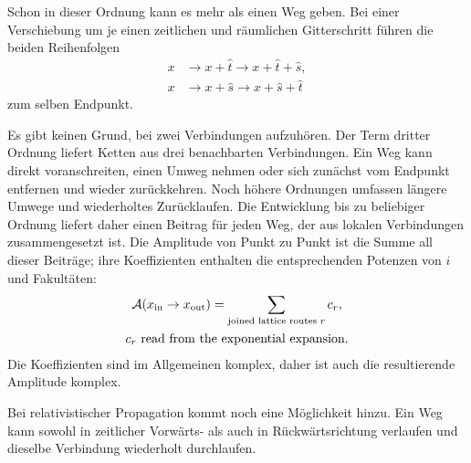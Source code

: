 Schon in dieser Ordnung kann es mehr als einen Weg geben. Bei einer Verschiebung um je einen zeitlichen und räumlichen Gitterschritt führen die beiden Reihenfolgen
\begin{align}
x
&\longrightarrow x+\hat t
\longrightarrow x+\hat t+\hat s,\\
x
&\longrightarrow x+\hat s
\longrightarrow x+\hat s+\hat t
\end{align}
zum selben Endpunkt.

\begin{classroomqa}
\end{classroomqa}

Es gibt keinen Grund, bei zwei Verbindungen aufzuhören. Der Term dritter Ordnung liefert Ketten aus drei benachbarten Verbindungen. Ein Weg kann direkt voranschreiten, einen Umweg nehmen oder sich zunächst vom Endpunkt entfernen und wieder zurückkehren. Noch höhere Ordnungen umfassen längere Umwege und wiederholtes Zurücklaufen. Die Entwicklung bis zu beliebiger Ordnung liefert daher einen Beitrag für jeden Weg, der aus lokalen Verbindungen zusammengesetzt ist. Die Amplitude von Punkt zu Punkt ist die Summe all dieser Beiträge; ihre Koeffizienten enthalten die entsprechenden Potenzen von \(i\) und Fakultäten:
\begin{equation}
\begin{gathered}
\mathcal{A}(x_{\mathrm{in}}\to x_{\mathrm{out}})
=
\sum_{\text{joined lattice routes }r}c_r,
\\
c_r\ \hbox{read from the exponential expansion}.
\end{gathered}
\end{equation}
Die Koeffizienten sind im Allgemeinen komplex, daher ist auch die resultierende Amplitude komplex.

Bei relativistischer Propagation kommt noch eine Möglichkeit hinzu. Ein Weg kann sowohl in zeitlicher Vorwärts- als auch in Rückwärtsrichtung verlaufen und dieselbe Verbindung wiederholt durchlaufen.

\begin{classroomqa}
\end{classroomqa}

